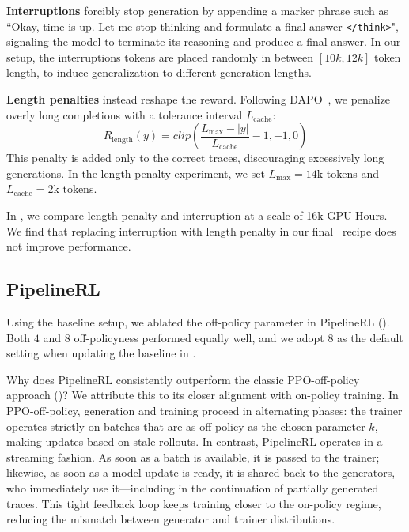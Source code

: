 \textbf{Interruptions} forcibly stop generation by appending a marker phrase such as ``Okay, time is up. Let me stop thinking and formulate a final answer \texttt{</think>}", signaling the model to terminate its reasoning and produce a final answer. In our setup, the interruptions tokens are placed randomly in between $[10k, 12k]$ token length, to induce generalization to different generation lengths.

\textbf{Length penalties} instead reshape the reward. 
Following DAPO~\citep{yu2025dapo}, we penalize overly long completions with a tolerance interval $L_{\text{cache}}$: 
\begin{equation}
R_{\text{length}}(y) = clip\left(\dfrac{L_{\max} - |y|}{L_{\text{cache}}} - 1, -1, 0\right)
\end{equation}
This penalty is added only to the correct traces, discouraging excessively long generations. 
In the length penalty experiment, we set $L_{\max} = 14\text{k}$ tokens and $L_{\text{cache}} = 2\text{k}$ tokens.

In , we compare length penalty and interruption at a scale of 16k GPU-Hours. We find that replacing interruption with length penalty in our final \scalerl\ recipe does not improve performance.


\subsection{PipelineRL} \label{appendix:pipelinerl}
Using the baseline setup, we ablated the off-policy parameter in PipelineRL (). 
Both $4$ and $8$ off-policyness performed equally well, and we adopt $8$ as the default setting when updating the baseline in . 

Why does PipelineRL consistently outperform the classic PPO-off-policy approach ()? 
We attribute this to its closer alignment with on-policy training. 
In PPO-off-policy, generation and training proceed in alternating phases: the trainer operates strictly on batches that are as off-policy as the chosen parameter $k$, making updates based on stale rollouts. 
In contrast, PipelineRL operates in a streaming fashion. 
As soon as a batch is available, it is passed to the trainer; likewise, as soon as a model update is ready, it is shared back to the generators, who immediately use it—including in the continuation of partially generated traces. 
This tight feedback loop keeps training closer to the on-policy regime, reducing the mismatch between generator and trainer distributions. 

